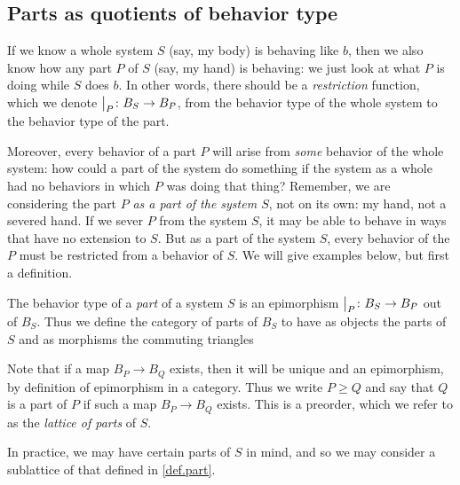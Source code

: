 \subsection{Parts as quotients of behavior type}
If we know a whole system $S$ (say, my body) is behaving like $b$, then we also know how any part $P$ of $S$ (say, my hand) is behaving: we just look at what $P$ is doing while $S$ does $b$. In other words, there should be a \emph{restriction} function, which we denote $\big|_{P}\colon B_S \to B_P$, from the behavior type of the whole system to the behavior type of the part. 

Moreover, every behavior of a part $P$ will arise from \emph{some} behavior of the whole system: how could a part of the system do something if the system as a whole had no behaviors in which $P$ was doing that thing? Remember, we are considering the part $P$ \emph{as a part of the system $S$}, not on its own: my hand, not a severed hand. If we sever $P$ from the system $S$, it may be able to behave in ways that have no extension to $S$. But as a part of the system $S$, every behavior of the $P$ must be restricted from a behavior of $S$. We will give examples below, but first a definition.

\begin{defn}\label{def.part}
The behavior type of a \emph{part} of a system $S$ is an epimorphism $\big|_{P}\colon B_S \to B_P$ out of $B_S$. Thus we define the category of parts of $B_S$ to have as objects the parts of $S$ and as morphisms the commuting triangles
        \begin{center}
        \end{center}
Note that if a map $B_P \to B_Q$ exists, then it will be unique and an epimorphism, by definition of epimorphism in a category. Thus we write $P \geq Q$ and say that $Q$ is a part of $P$ if such a map $B_P \to B_Q$ exists. This is a preorder, which we refer to as the \emph{lattice of parts} of $S$.
\end{defn}

In practice, we may have certain parts of $S$ in mind, and so we may consider a sublattice of that defined in \cref{def.part}. 

